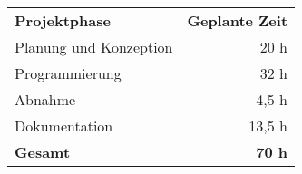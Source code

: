 
\begin{tabular}{lr}
\rowcolor{heading}\textbf{Projektphase} & \textbf{Geplante Zeit} \\
Planung und Konzeption & 20 h \\
\rowcolor{odd}Programmierung & 32 h \\
Abnahme & 4,5 h \\
\rowcolor{odd}Dokumentation & 13,5 h \\
\hline
\hline
\textbf{Gesamt} & \textbf{70 h} \\
\end{tabular}
